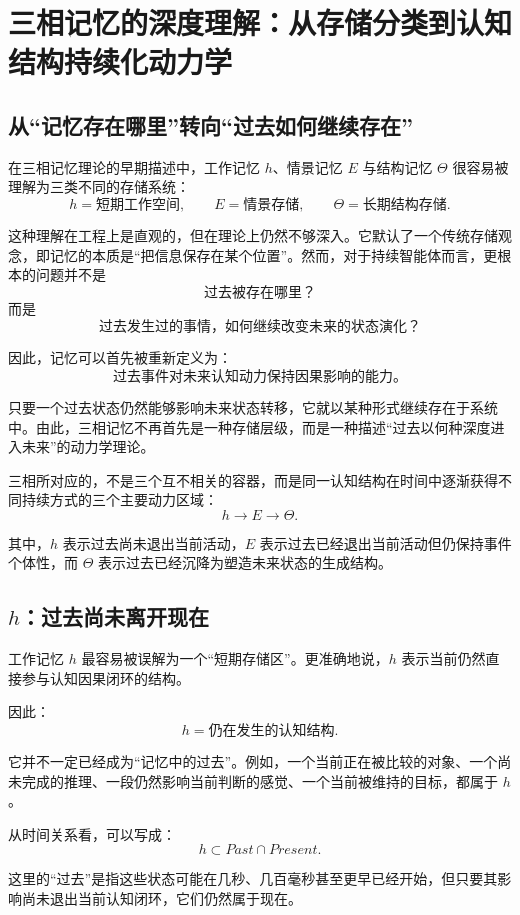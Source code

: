 \chapter{三相记忆的深度理解：从存储分类到认知结构持续化动力学}

\section{从“记忆存在哪里”转向“过去如何继续存在”}

在三相记忆理论的早期描述中，工作记忆 $h$、情景记忆 $E$ 与结构记忆 $\Theta$ 很容易被理解为三类不同的存储系统：
\[
h=\text{短期工作空间},
\qquad
E=\text{情景存储},
\qquad
\Theta=\text{长期结构存储}.
\]

这种理解在工程上是直观的，但在理论上仍然不够深入。它默认了一个传统存储观念，即记忆的本质是“把信息保存在某个位置”。然而，对于持续智能体而言，更根本的问题并不是
\[
\text{过去被存在哪里？}
\]
而是
\[
\boxed{
\text{过去发生过的事情，如何继续改变未来的状态演化？}
}
\]

因此，记忆可以首先被重新定义为：
\[
\boxed{
\text{过去事件对未来认知动力保持因果影响的能力。}
}
\]

只要一个过去状态仍然能够影响未来状态转移，它就以某种形式继续存在于系统中。由此，三相记忆不再首先是一种存储层级，而是一种描述“过去以何种深度进入未来”的动力学理论。

三相所对应的，不是三个互不相关的容器，而是同一认知结构在时间中逐渐获得不同持续方式的三个主要动力区域：
\[
\boxed{
h
\rightarrow
E
\rightarrow
\Theta.
}
\]

其中，$h$ 表示过去尚未退出当前活动，$E$ 表示过去已经退出当前活动但仍保持事件个体性，而 $\Theta$ 表示过去已经沉降为塑造未来状态的生成结构。

\section{$h$：过去尚未离开现在}

工作记忆 $h$ 最容易被误解为一个“短期存储区”。更准确地说，$h$ 表示当前仍然直接参与认知因果闭环的结构。

因此：
\[
\boxed{
h=
\text{仍在发生的认知结构}.
}
\]

它并不一定已经成为“记忆中的过去”。例如，一个当前正在被比较的对象、一个尚未完成的推理、一段仍然影响当前判断的感觉、一个当前被维持的目标，都属于 $h$。

从时间关系看，可以写成：
\[
\boxed{
h \subset Past\cap Present.
}
\]

这里的“过去”是指这些状态可能在几秒、几百毫秒甚至更早已经开始，但只要其影响尚未退出当前认知闭环，它们仍然属于现在。

